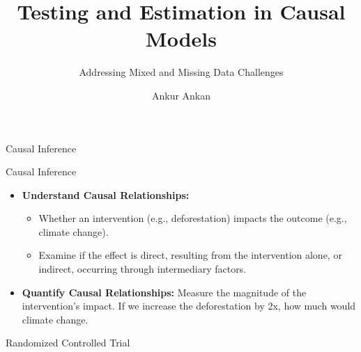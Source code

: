\documentclass[aspectratio=169]{beamer}
\begin{document}
\title{Testing and Estimation in Causal Models}
\subtitle{Addressing Mixed and Missing Data Challenges}
\author{Ankur Ankan}
\date{}

\maketitle

\begin{frame}{Causal Inference}

	\vspace{2em}

\end{frame}

\begin{frame}{Causal Inference}

	\vspace{2em}

	\begin{itemize}
		\item \textbf{Understand Causal Relationships: }
			\begin{itemize}
				\item Whether an intervention (e.g., deforestation) impacts the outcome (e.g., climate change).
				\item Examine if the effect is direct, resulting from the intervention alone, or indirect, occurring through intermediary factors.
			\end{itemize}
		\item \textbf{Quantify Causal Relationships: } Measure the magnitude of the intervention's impact. If we increase the deforestation by 2x, how much would climate change.
	\end{itemize}
\end{frame}

\begin{frame}{Randomized Controlled Trial}	
\end{frame}
\end{document}
